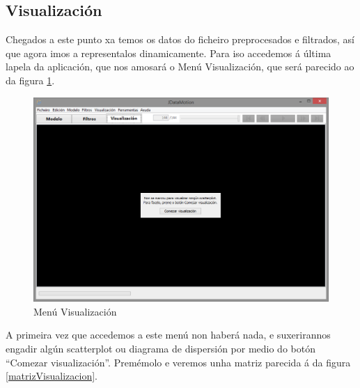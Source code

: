 \subsection{Visualización}

Chegados a este punto xa temos os datos do ficheiro preprocesados e filtrados, así que agora imos a representalos dinamicamente. Para iso accedemos á última lapela da aplicación, que nos amosará o Menú Visualización, que será parecido ao da figura \ref{manualVisualizacion}.

\begin{figure}
\centering
\includegraphics[width=\textwidth,height=\textheight,keepaspectratio]{figuras/manualVisualizacion}
\caption{Menú Visualización}
\label{manualVisualizacion}
\end{figure}

A primeira vez que accedemos a este menú non haberá nada, e suxerirannos engadir algún scatterplot ou diagrama de dispersión por medio do botón ``Comezar visualización''. Premémolo e veremos unha matriz parecida á da figura \ref{matrizVisualizacion}.

